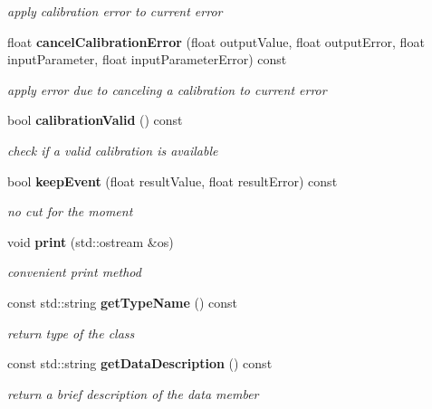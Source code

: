 \begin{DoxyCompactItemize}
\begin{DoxyCompactList}\small\item\em apply calibration error to current error \end{DoxyCompactList}\item 
float {\bf cancel\-Calibration\-Error} (float output\-Value, float output\-Error, float input\-Parameter, float input\-Parameter\-Error) const \label{classCALICE_1_1SaturationConstants_a19d0bb585843573555df4e63c6038acd}

\begin{DoxyCompactList}\small\item\em apply error due to canceling a calibration to current error \end{DoxyCompactList}\item 
bool {\bf calibration\-Valid} () const \label{classCALICE_1_1SaturationConstants_a7fdebcaa3ebf3b099aa11524e347ace3}

\begin{DoxyCompactList}\small\item\em check if a valid calibration is available \end{DoxyCompactList}\item 
bool {\bf keep\-Event} (float result\-Value, float result\-Error) const \label{classCALICE_1_1SaturationConstants_a4df07d49bfccab7e7586bffddee8583c}

\begin{DoxyCompactList}\small\item\em no cut for the moment \end{DoxyCompactList}\item 
void {\bf print} (std\-::ostream \&os)\label{classCALICE_1_1SaturationConstants_a874667af6a08bd188c53dfa36757b915}

\begin{DoxyCompactList}\small\item\em convenient print method \end{DoxyCompactList}\item 
const std\-::string {\bf get\-Type\-Name} () const \label{classCALICE_1_1SaturationConstants_a6868223cd0a1232d1cafee7032f47fc0}

\begin{DoxyCompactList}\small\item\em return type of the class \end{DoxyCompactList}\item 
const std\-::string {\bf get\-Data\-Description} () const \label{classCALICE_1_1SaturationConstants_a1f4ea94ddbcb2aed522fc35ea20a8d78}

\begin{DoxyCompactList}\small\item\em return a brief description of the data member \end{DoxyCompactList}\end{DoxyCompactItemize}

